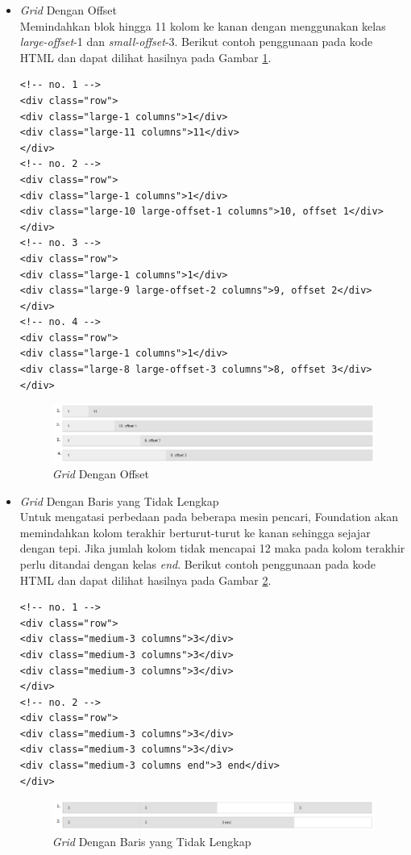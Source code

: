 \begin{enumerate}[(1)]
\begin{itemize}
\item {\it Grid} Dengan Offset\\
Memindahkan blok hingga 11 kolom ke kanan dengan menggunakan kelas
{\it large-offset}-1 dan {\it small-offset}-3. Berikut contoh penggunaan pada kode HTML dan dapat dilihat hasilnya pada Gambar \ref{fig:gridoffset}.
\begin{lstlisting}[basicstyle=\footnotesize]
<!-- no. 1 -->
<div class="row">
<div class="large-1 columns">1</div>
<div class="large-11 columns">11</div>
</div>
<!-- no. 2 -->
<div class="row">
<div class="large-1 columns">1</div>
<div class="large-10 large-offset-1 columns">10, offset 1</div>
</div>
<!-- no. 3 -->
<div class="row">
<div class="large-1 columns">1</div>
<div class="large-9 large-offset-2 columns">9, offset 2</div>
</div>
<!-- no. 4 -->
<div class="row">
<div class="large-1 columns">1</div>
<div class="large-8 large-offset-3 columns">8, offset 3</div>
</div>
\end{lstlisting}
\begin{figure}[H]
\centering
\includegraphics[scale=0.6]{Gambar/gridoffset.png}
\caption[{\it Grid} Dengan Offset]{{\it Grid} Dengan Offset}
\label{fig:gridoffset}
\end{figure}
\item {\it Grid} Dengan Baris yang Tidak Lengkap\\
Untuk mengatasi perbedaan pada beberapa mesin pencari, Foundation akan
memindahkan kolom terakhir berturut-turut ke kanan sehingga sejajar dengan tepi. Jika jumlah kolom tidak mencapai 12 maka pada kolom terakhir perlu ditandai dengan kelas {\it end}. Berikut contoh penggunaan pada kode HTML dan dapat dilihat hasilnya pada Gambar \ref{fig:gridtidaklengkap}.
\begin{lstlisting}[basicstyle=\footnotesize]
<!-- no. 1 -->
<div class="row">
<div class="medium-3 columns">3</div>
<div class="medium-3 columns">3</div>
<div class="medium-3 columns">3</div>
</div>
<!-- no. 2 -->
<div class="row">
<div class="medium-3 columns">3</div>
<div class="medium-3 columns">3</div>
<div class="medium-3 columns end">3 end</div>
</div>
\end{lstlisting}
\begin{figure}[H]
\centering
\includegraphics[scale=0.6]{Gambar/gridtidaklengkap.png}
\caption[{\it Grid} Dengan Baris yang Tidak Lengkap]{{\it Grid} Dengan Baris yang Tidak Lengkap}
\label{fig:gridtidaklengkap}
\end{figure}


\end{itemize}
\end{enumerate}
